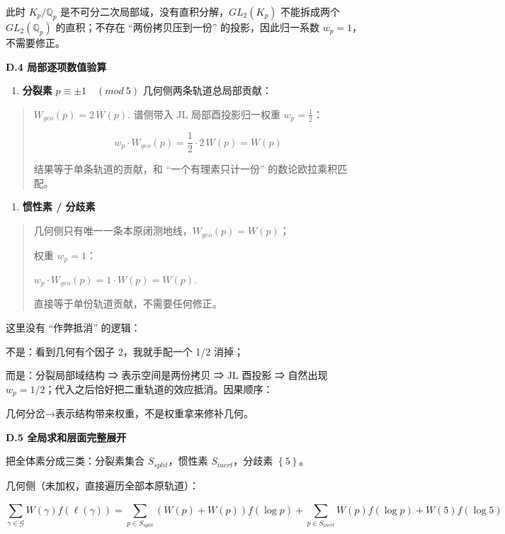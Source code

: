 \documentclass[11pt,a4paper]{ctexart}
\begin{document}
此时 \(K_{p}/\mathbb{Q}_{p}\)
是不可分二次局部域，没有直积分解，\({GL}_{2}\left( K_{p} \right)\)
不能拆成两个 \({GL}_{2}\left( \mathbb{Q}_{p} \right)\) 的直积；不存在
``两份拷贝压到一份'' 的投影，因此归一系数 \(w_{p} = 1\)，不需要修正。

\textbf{D.4 局部逐项数值验算}

\begin{enumerate}
\def\labelenumi{\arabic{enumi}.}
\tightlist
\item
  \textbf{分裂素} \(p \equiv \pm 1\quad(mod\ 5)\)
  几何侧两条轨道总局部贡献：
\end{enumerate}

\begin{quote}
\(W_{geo}(p) = 2\, W(p).\) 谱侧带入 JL 局部酉投影归一权重
\(w_{p} = \frac{1}{2}\)：

\[w_{p} \cdot W_{geo}(p) = \frac{1}{2} \cdot 2\, W(p) = W(p)\]

结果等于单条轨道的贡献，和 ``一个有理素只计一份'' 的数论欧拉乘积匹配。
\end{quote}

\begin{enumerate}
\def\labelenumi{\arabic{enumi}.}
\setcounter{enumi}{1}
\tightlist
\item
  \textbf{惯性素 / 分歧素}
\end{enumerate}

\begin{quote}
几何侧只有唯一一条本原闭测地线，\(W_{geo}(p) = W(p)\)；

权重 \(w_{p} = 1\)：

\(w_{p} \cdot W_{geo}(p) = 1 \cdot W(p) = W(p).\)

直接等于单份轨道贡献，不需要任何修正。
\end{quote}

这里没有 ``作弊抵消'' 的逻辑：

不是：看到几何有个因子 2，我就手配一个 1/2 消掉；

而是：分裂局部域结构 ⇒ 表示空间是两份拷贝 ⇒ JL 酉投影 ⇒ 自然出现
\(w_{p} = 1/2\)；代入之后恰好把二重轨道的效应抵消。因果顺序：

几何分岔→表示结构带来权重，不是权重拿来修补几何。

\textbf{D.5 全局求和层面完整展开}

把全体素分成三类：分裂素集合 \(S_{split}\)，惯性素 \(S_{inert}\)，分歧素
\(\left\{ 5 \right\}\)。

几何侧（未加权，直接遍历全部本原轨道）：

\[\sum_{\gamma\mathcal{\in G}}^{}W(\gamma)f\left( \ell\left(\gamma\right) \right) = \sum_{p \in S_{split}}^{}\left( W(p) + W(p) \right)f\left( \log p \right) + \sum_{p \in S_{inert}}^{}W(p)f\left( \log p \right) + W(5)f\left( \log 5 \right)\]
\end{document}
